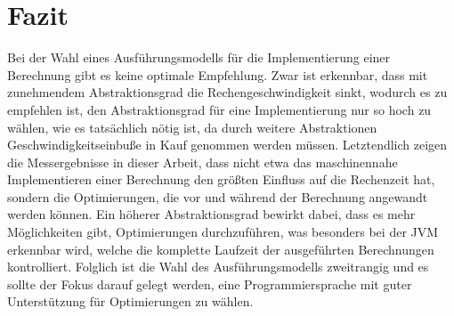 \documentclass[11pt, parskip=half]{scrartcl}       %
\begin{document}
\section{Fazit}

Bei der Wahl eines Ausführungsmodells für die Implementierung einer Berechnung gibt es keine optimale Empfehlung.
Zwar ist erkennbar, dass mit zunehmendem Abstraktionsgrad die Rechengeschwindigkeit sinkt, wodurch es zu empfehlen ist, den Abstraktionsgrad für eine Implementierung nur so hoch zu wählen, wie es tatsächlich nötig ist, da durch weitere Abstraktionen Geschwindigkeitseinbuße in Kauf genommen werden müssen.
Letztendlich zeigen die Messergebnisse in dieser Arbeit, dass nicht etwa das maschinennahe Implementieren einer Berechnung den größten Einfluss auf die Rechenzeit hat, sondern die Optimierungen, die vor und während der Berechnung angewandt werden können.
Ein höherer Abstraktionsgrad bewirkt dabei, dass es mehr Möglichkeiten gibt, Optimierungen durchzuführen, was besonders bei der JVM erkennbar wird, welche die komplette Laufzeit der ausgeführten Berechnungen kontrolliert.
Folglich ist die Wahl des Ausführungsmodells zweitrangig und es sollte der Fokus darauf gelegt werden, eine Programmiersprache mit guter Unterstützung für Optimierungen zu wählen.

\newpage

{}

\end{document}
